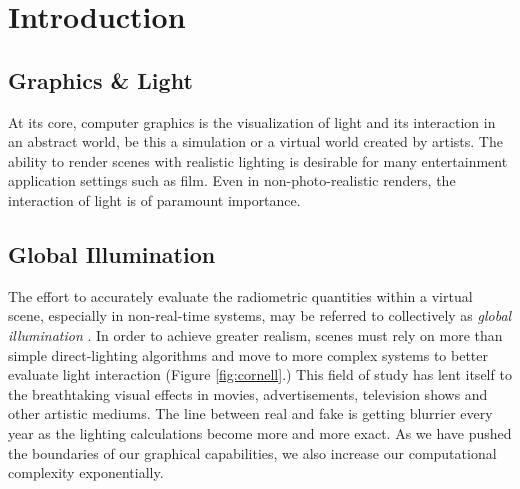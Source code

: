 \documentclass[12pt]{ucthesis}
\begin{document}
\pagestyle{plain}




\renewcommand{\baselinestretch}{1.66}







\chapter{Introduction}
\label{intro}

\section{Graphics \& Light}
At its core, computer graphics is the visualization of light and its interaction in an abstract world, be this a simulation or a virtual world created by artists.  The ability to render scenes with realistic lighting is desirable for many entertainment application settings such as film.  Even in non-photo-realistic renders, the interaction of light is of paramount importance.

\section{Global Illumination}
The effort to accurately evaluate the radiometric quantities within a virtual scene, especially in non-real-time systems, may be referred to collectively as \textit{global illumination} \cite{verth:2008}.  In order to achieve greater realism, scenes must rely on more than simple direct-lighting algorithms and move to more complex systems to better evaluate light interaction (Figure \ref{fig:cornell}.)  This field of study has lent itself to the breathtaking visual effects in movies, advertisements, television shows and other artistic mediums.  The line between real and fake is getting blurrier every year as the lighting calculations become more and more exact.  As we have pushed the boundaries of our graphical capabilities, we also increase our computational complexity exponentially.
\end{document}
